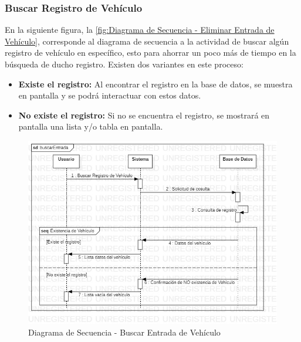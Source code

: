 \subsubsection{Buscar Registro de Vehículo}
En la siguiente figura, la \ref{fig:Diagrama de Secuencia - Eliminar Entrada de Vehículo}, corresponde al diagrama de secuencia a la actividad de buscar algún registro de vehículo en específico, esto para ahorrar un poco más de tiempo en la búsqueda de ducho registro. Existen dos variantes en este proceso:
\begin{itemize}
	\item \textbf{Existe el registro:} Al encontrar el registro en la base de datos, se muestra en pantalla y se podrá interactuar con estos datos.
	\item \textbf{No existe el registro:} Si no se encuentra el registro, se mostrará en pantalla una lista y/o tabla en pantalla.
\end{itemize}
\begin{figure}[!h]
	\centering
	\includegraphics[width=1\textwidth]{./diseno/vprocesos/imagenes/buscarEntrada}
	\caption{Diagrama de Secuencia - Buscar Entrada de Vehículo}
	\label{fig:Diagrama de Secuencia - Buscar Entrada de Vehículo}
\end{figure}
 \clearpage